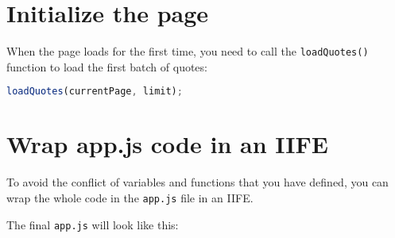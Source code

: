 \documentclass[11pt]{article}
\begin{document}
\section*{Initialize the page}

When the page loads for the first time, you need to call the
\verb|loadQuotes()| function to load the first batch of quotes:

\begin{lstlisting}[language=JavaScript]
loadQuotes(currentPage, limit);
\end{lstlisting}

\section*{Wrap app.js code in an IIFE}

To avoid the conflict of variables and functions that you have defined,
you can wrap the whole code in the \verb|app.js| file in an IIFE.
\newpage

\noindent
The final \verb|app.js| will look like this:
\end{document}
